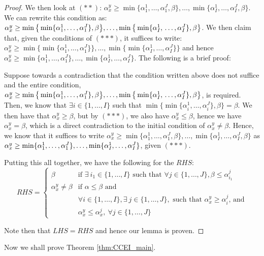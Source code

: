 \documentclass{article} %
\theoremstyle{style1}
\theoremstyle{style1}
\theoremstyle{example}
\begin{document}
\begin{proof}
We then look at $(**)$: $\alpha_x^y\geq \min\{\alpha_1^1,\ldots,\alpha_1^J,\beta\},\ldots,\min\{\alpha_I^1,\ldots,\alpha_I^J,\beta\}$. We can rewrite this condition as: $\alpha_x^y\geq \min\big\{\min\{\alpha_1^1,\ldots,\alpha_1^J\},\beta\big\},\ldots,\min\big\{\min\{\alpha_I^1,\\\ldots,\alpha_I^J\},\beta\big\}$. We then claim that, given the conditions of $(***)$, it suffices to write: $\alpha_x^y\geq \min\big\{\min\{\alpha_1^1,\ldots,\alpha_1^J\}\big\},\ldots,\min\big\{\min\{\alpha_I^1,\ldots,\alpha_I^J\}\big\}$ and hence $\alpha_x^y\geq \min\{\alpha_1^1,\ldots,\alpha_1^J\},\ldots,\min\{\alpha_I^1,\ldots,\alpha_I^J\}$. The following is a brief proof:

Suppose towards a contradiction that the condition written above does not suffice and the entire condition, $\alpha_x^y\geq \min\big\{\min\{\alpha_1^1,\ldots,\alpha_1^J\},\beta\big\},\ldots,\min\big\{\min\{\alpha_I^1,\\\ldots,\alpha_I^J\},\beta\big\}$, is required. Then, we know that $\exists i\in\{1,\ldots,I\}$ such that $\min\big\{\min\{\alpha_i^1,\ldots,\alpha_i^J\},\beta\big\}=\beta$. We then have that $\alpha_x^y\geq\beta$, but by $(***)$, we also have $\alpha_x^y\leq\beta$, hence we have $\alpha_x^y=\beta$, which is a direct contradiction to the initial condition of $\alpha_x^y\not=\beta$. Hence, we know that it suffices to write $\alpha_x^y\geq \min\{\alpha_1^1,\ldots,\alpha_1^J,\beta\},\ldots,\min\{\alpha_I^1,\ldots,\alpha_I^J,\beta\}$ as $\alpha_x^y\geq \min\{\alpha_1^1,\ldots,\alpha_1^J\},\ldots,\min\{\\ \alpha_I^1,\ldots,\alpha_I^J\}$, given $(***)$.

Putting this all together, we have the following for the $RHS$:
\[
RHS=
\begin{cases}
\beta & \textrm{if }\exists\ i_1\in\{1,\ldots,I\} \textrm{ such that }\forall j\in\{1,\ldots,J\}, \beta\leq\alpha_{i_1}^j \\
\alpha_x^y\not=\beta & \textrm{if } \alpha\leq\beta \textrm{ and}\\
& \forall i\in\{1,\ldots,I\}, \exists\ j\in\{1,\ldots,J\}, \textrm{ such that } \alpha_x^y\geq\alpha_i^j \textrm{, and}\\
& \alpha_x^y\leq\alpha_x^j,\ \forall j\in\{1,\ldots,J\}
\end{cases}
\]

Note then that $LHS=RHS$ and hence our lemma is proven.
\end{proof}

Now we shall prove Theorem \ref{thm:CCEI_main}.
\end{document}
